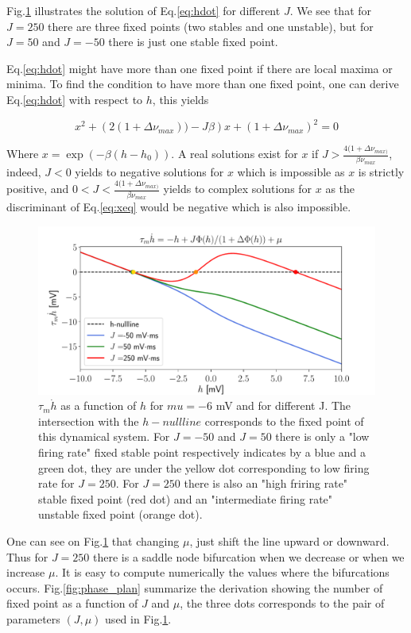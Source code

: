\documentclass[12pt,twoside]{report}
\begin{document}
Fig.\ref{fig:hdyn} illustrates the solution of Eq.\eqref{eq:hdot} for different $J$. We see that for $J=250$ there are three fixed points (two stables and one unstable), but for $J=50$ and $J=-50$ there is just one stable fixed point. 

Eq.\eqref{eq:hdot} might have more than one fixed point if there are local maxima or minima. To find the condition to have more than one fixed point, one can derive Eq.\eqref{eq:hdot} with respect to $h$, this yields

\begin{equation}
\label{eq:xeq}
x^2+\left(2(1+\Delta \nu_{max}))-J\beta\right)x +\left(1+\Delta\nu_{max}\right)^2=0
\end{equation}

Where $x=\exp(-\beta(h-h_0))$. A real solutions exist for $x$ if $J>\frac{4(1+\Delta \nu_{max)}}{\beta\nu_{max}}$, indeed, $J<0$ yields to negative solutions for $x$ which is impossible as $x$ is strictly positive, and $0<J<\frac{4(1+\Delta \nu_{max)}}{\beta\nu_{max}}$ yields to complex solutions for $x$ as the discriminant of Eq.\eqref{eq:xeq} would be negative which is also impossible.

\begin{figure}[h!]
	\centering
	\includegraphics[width=0.8\linewidth]{hdyn.pdf}
	\caption{ $\tau_m \dot{h}$ as a function of $h$ for $mu=-6$ mV and for different J. The intersection with the $h-nullline$ corresponds to the fixed point of this dynamical system. For $J=-50$  and  $J=50$  there is only a  "low firing rate" fixed stable point respectively indicates by a blue and a green dot, they are under the yellow dot corresponding to low firing rate for $J=250$. For $J=250$ there is also an "high friring rate" stable fixed point (red dot)  and an "intermediate firing rate" unstable fixed point (orange dot).
	}
	\label{fig:hdyn}
\end{figure}

One can see on Fig.\ref{fig:hdyn} that changing $\mu$, just shift the line upward or downward. Thus for $J=250$ there is a saddle node bifurcation when we decrease or when we increase $\mu$. It is easy to compute numerically the values where the bifurcations occurs. Fig.\ref{fig:phase_plan} summarize the derivation showing the number of fixed point as a function of $J$ and $\mu$, the three dots corresponds to the pair of parameters $(J,\mu)$ used in Fig.\ref{fig:hdyn}.
\end{document}
